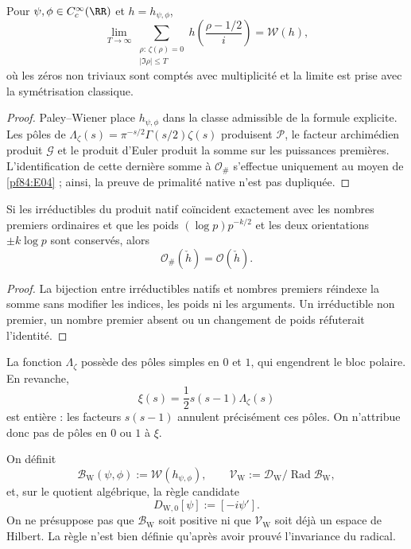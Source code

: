 \begin{theorem}
\label{pf84:E03} Pour \(\psi,\phi\in C_c^\infty(\RR)\) et \(h=h_{\psi,\phi}\),
\[
 \lim_{T\to\infty}
 \sum_{\substack{\rho:\,\zeta(\rho)=0\\|\Im\rho|\le T}}
 h\!\left(\frac{\rho-1/2}{i}\right)
 =\mathcal W(h),
\]
où les zéros non triviaux sont comptés avec multiplicité et la limite est
prise avec la symétrisation classique.
\end{theorem}

\begin{proof}
Paley--Wiener place \(h_{\psi,\phi}\) dans la classe admissible de la formule
explicite. Les pôles de
\(\Lambda_\zeta(s)=\pi^{-s/2}\Gamma(s/2)\zeta(s)\) produisent
\(\mathcal P\), le facteur archimédien produit \(\mathcal G\) et le produit
d'Euler produit la somme sur les puissances premières. L'identification de cette
dernière somme à \(\mathcal O_\#\) s'effectue uniquement au moyen de
\cref{pf84:E04} ; ainsi, la preuve de primalité native n'est pas dupliquée.
\end{proof}

\begin{proposition}
\label{pf84:E04}
Si les irréductibles du produit natif coïncident exactement avec les nombres premiers
ordinaires et que les poids
\((\log p)p^{-k/2}\) et les deux orientations \(\pm k\log p\) sont conservés, alors
\[
 \mathcal O_\#(\check h)=\mathcal O(\check h).
\]
\end{proposition}

\begin{proof}
La bijection entre irréductibles natifs et nombres premiers réindexe la somme sans
modifier les indices, les poids ni les arguments. Un irréductible non premier, un nombre premier
absent ou un changement de poids réfuterait l'identité.
\end{proof}

\begin{remark}
\label{pf84:E05}
La fonction \(\Lambda_\zeta\) possède des pôles simples en \(0\) et \(1\), qui
engendrent le bloc polaire. En revanche,
\[
 \xi(s)=\frac12s(s-1)\Lambda_\zeta(s)
\]
est entière : les facteurs \(s(s-1)\) annulent précisément ces pôles. On
n'attribue donc pas de pôles en \(0\) ou \(1\) à \(\xi\).
\end{remark}

\begin{definition}
\label{pf84:E06}
On définit
\[
 \mathcal B_{\mathrm W}(\psi,\phi)
 :=\mathcal W(h_{\psi,\phi}),
 \qquad
 \mathcal V_{\mathrm W}:=
 \mathcal D_{\mathrm W}/\operatorname{Rad}\mathcal B_{\mathrm W},
\]
et, sur le quotient algébrique, la règle candidate
\[
 D_{\mathrm W,0}[\psi]:=[-i\psi'].
\]
On ne présuppose pas que \(\mathcal B_{\mathrm W}\) soit positive ni que
\(\mathcal V_{\mathrm W}\) soit déjà un espace de Hilbert. La règle n'est
bien définie qu'après avoir prouvé l'invariance du radical.
\end{definition}

